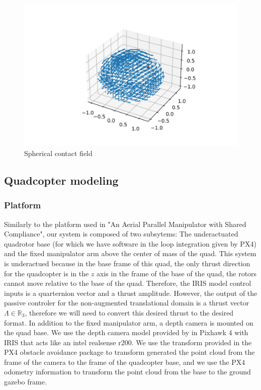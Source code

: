 \begin{figure}[h!]
    \centering
    \includegraphics[width=\linewidth]{Images/sphericalfield.png}
    \caption{Spherical contact field}
    \label{fig:spherical}
\end{figure}

\subsection{Quadcopter modeling}
\subsubsection{Platform}
Similarly to the platform used in "An Aerial Parallel Manipulator with Shared Compliance", our system is composed of two subsytems: The underactuated quadrotor base (for which we have software in the loop integration given by PX4) and the fixed manipulator arm above the center of mass of the quad.
This system is underactued because in the base frame of this quad, the only thrust direction for the quadcopter is in the $z$ axis in the frame of the base of the quad, the rotors cannot move relative to the base of the quad. Therefore, the IRIS model control inputs is a quarternion vector and a thrust amplitude. However, the output of the passive controler for the non-augmented translational domain is a thrust vector $\Lambda \in\mathbb R_3 $, therefore we will need to convert this desired thrust to the desired format.
In addition to the fixed manipulator arm, a depth camera is mounted on the quad base. We use the depth camera model provided by in Pixhawk 4 with IRIS that acts like an intel realsense r200. We use the transform provided in the PX4 obstacle avoidance package to transform generated the point cloud from the frame of the camera to the frame of the quadcopter base, and we use the PX4 odometry information to transform the point cloud from the base to the ground gazebo frame.

